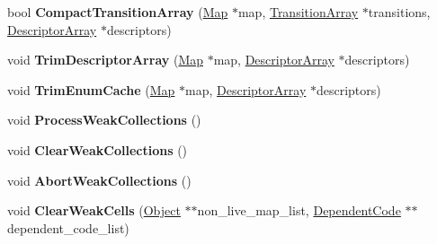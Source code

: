 \begin{DoxyCompactItemize}
\item 
bool {\bfseries Compact\+Transition\+Array} (\hyperlink{classv8_1_1internal_1_1_map}{Map} $\ast$map, \hyperlink{classv8_1_1internal_1_1_transition_array}{Transition\+Array} $\ast$transitions, \hyperlink{classv8_1_1internal_1_1_descriptor_array}{Descriptor\+Array} $\ast$descriptors)\hypertarget{classv8_1_1internal_1_1_mark_compact_collector_ad1800ffb0a109763056530effa2a4d88}{}\label{classv8_1_1internal_1_1_mark_compact_collector_ad1800ffb0a109763056530effa2a4d88}

\item 
void {\bfseries Trim\+Descriptor\+Array} (\hyperlink{classv8_1_1internal_1_1_map}{Map} $\ast$map, \hyperlink{classv8_1_1internal_1_1_descriptor_array}{Descriptor\+Array} $\ast$descriptors)\hypertarget{classv8_1_1internal_1_1_mark_compact_collector_a9e84a2a23bbdc07d54c9a511682626d8}{}\label{classv8_1_1internal_1_1_mark_compact_collector_a9e84a2a23bbdc07d54c9a511682626d8}

\item 
void {\bfseries Trim\+Enum\+Cache} (\hyperlink{classv8_1_1internal_1_1_map}{Map} $\ast$map, \hyperlink{classv8_1_1internal_1_1_descriptor_array}{Descriptor\+Array} $\ast$descriptors)\hypertarget{classv8_1_1internal_1_1_mark_compact_collector_adf87413d8a87159950d91bf65a6f65fb}{}\label{classv8_1_1internal_1_1_mark_compact_collector_adf87413d8a87159950d91bf65a6f65fb}

\item 
void {\bfseries Process\+Weak\+Collections} ()\hypertarget{classv8_1_1internal_1_1_mark_compact_collector_a42b7242eb42fb9e6d2220b820dd9b181}{}\label{classv8_1_1internal_1_1_mark_compact_collector_a42b7242eb42fb9e6d2220b820dd9b181}

\item 
void {\bfseries Clear\+Weak\+Collections} ()\hypertarget{classv8_1_1internal_1_1_mark_compact_collector_a8683f1e2a840f0b54efff9b4a3d30e6a}{}\label{classv8_1_1internal_1_1_mark_compact_collector_a8683f1e2a840f0b54efff9b4a3d30e6a}

\item 
void {\bfseries Abort\+Weak\+Collections} ()\hypertarget{classv8_1_1internal_1_1_mark_compact_collector_a420ad6d992638eaa894d6724e3ac5e25}{}\label{classv8_1_1internal_1_1_mark_compact_collector_a420ad6d992638eaa894d6724e3ac5e25}

\item 
void {\bfseries Clear\+Weak\+Cells} (\hyperlink{classv8_1_1internal_1_1_object}{Object} $\ast$$\ast$non\+\_\+live\+\_\+map\+\_\+list, \hyperlink{classv8_1_1internal_1_1_dependent_code}{Dependent\+Code} $\ast$$\ast$dependent\+\_\+code\+\_\+list)\hypertarget{classv8_1_1internal_1_1_mark_compact_collector_a0b2bfcfba6b60750005a4a6a841168aa}{}\label{classv8_1_1internal_1_1_mark_compact_collector_a0b2bfcfba6b60750005a4a6a841168aa}


\end{DoxyCompactItemize}

